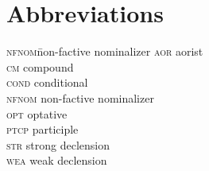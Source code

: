 \documentclass[output=paper]{LSP/langsci}
\begin{document}
\section*{Abbreviations}
\begin{multicols}{2}
\begin{tabbing}
\textsc{nfnom}\hspace{1em}\= non-factive nominalizer  \kill
\textsc{aor}  \> aorist        \\
\textsc{cm}   \> compound     \\
\textsc{cond} \> conditional      \\
\textsc{nfnom}\> non-factive nominalizer  \\
\textsc{opt}  \> optative        \\
\textsc{ptcp} \> participle  \\
\textsc{str}  \> strong declension            \\
\textsc{wea}  \> weak declension\\
\end{tabbing}
\end{multicols}

{\sloppy
\printbibliography[heading=subbibliography,notkeyword=this]
}


 
\end{document}
